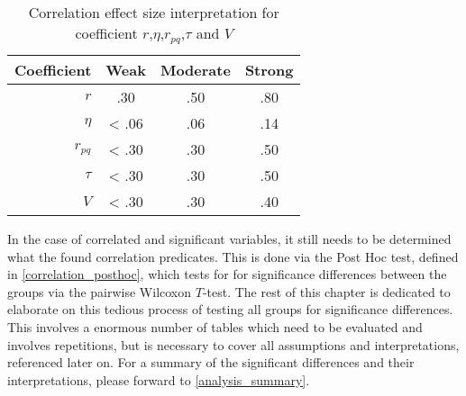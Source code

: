 \begin{table}[ht]
	\centering
	\begin{tabular}{r|c|c|c}  
		\toprule
		Coefficient & Weak 	& Moderate 	& Strong \\
		\midrule
		$r$ 		& .30	& .50		& .80 \\
		$\eta$ 		& < .06 & .06		& .14 \\
		$r_{pq}$	& < .30	& .30		& .50 \\
		$\tau$ 		& < .30	& .30		& .50 \\
		$V$ 		& < .30	& .30		& .40 \\
		\bottomrule
	\end{tabular}
	\caption{Correlation effect size interpretation for coefficient $r$,$\eta$,$r_{pq}$,$\tau$ and $V$}
	\label{tbl:correlation_interpretation_guidelines}
\end{table}

In the case of correlated and significant variables, it still needs to be determined what the found correlation predicates. This is done via the Post Hoc test, defined in \cref{correlation_posthoc}, which tests for for significance differences between the groups via the pairwise Wilcoxon $T$-test. The rest of this chapter is dedicated to elaborate on this tedious process of testing all groups for significance differences. This involves a enormous number of tables which need to be evaluated and involves repetitions, but is necessary to cover all assumptions and interpretations, referenced later on. For a summary of the significant differences and their interpretations, please forward to \cref{analysis_summary}.


\clearpage

\clearpage

\clearpage

\clearpage


\clearpage





